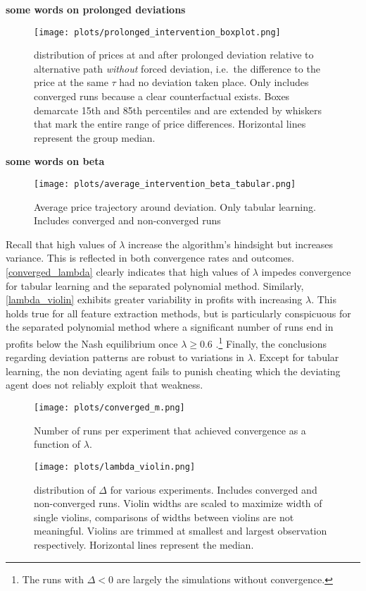 	\textbf{some words on prolonged deviations}
	
\begin{figure}
		\texttt{[image: plots/prolonged\_intervention\_boxplot.png]}
		\caption{distribution of prices at and after prolonged deviation relative to alternative path \emph{without} forced deviation, i.e.\ the difference to the price at the same $\tau$ had no deviation taken place. Only includes converged runs because a clear counterfactual exists. Boxes demarcate 15th and 85th percentiles and are extended by whiskers that mark the entire range of price differences. Horizontal lines represent the group median.}
		\label{prolonged_intervention_boxplot}
\end{figure}

\textbf{some words on beta}

\begin{figure}
	\texttt{[image: plots/average\_intervention\_beta\_tabular.png]}
	\caption{Average price trajectory around deviation. Only tabular learning. Includes converged and non-converged runs}
	\label{average_intervention_beta_tabular}
\end{figure}

Recall that high values of $\lambda$ increase the algorithm's hindsight but increases variance. This is reflected in both convergence rates and outcomes. \autoref{converged_lambda} clearly indicates that high values of $\lambda$ impedes convergence for tabular learning and the separated polynomial method. Similarly, \autoref{lambda_violin} exhibits greater variability in profits with increasing $\lambda$. This holds true for all feature extraction methods, but is particularly conspicuous for the separated polynomial method where a significant number of runs end in profits below the Nash equilibrium once $\lambda \ge 0.6$ .\footnote{The runs with $\Delta <0$ are largely the simulations without convergence.} Finally, the conclusions regarding deviation patterns are robust to variations in $\lambda$. Except for tabular learning, the non deviating agent fails to punish cheating which the deviating agent does not reliably exploit that weakness.

\begin{figure}
	\texttt{[image: plots/converged\_m.png]}
	\caption{Number of runs per experiment that achieved convergence as a function of $\lambda$.}
	\label{converged_lambda}
\end{figure}

\begin{figure}
	\texttt{[image: plots/lambda\_violin.png]}
	\caption{distribution of $\Delta$ for various experiments. Includes converged and non-converged runs. Violin widths are scaled to maximize width of single violins, comparisons of widths between violins are not meaningful. Violins are trimmed at smallest and largest observation respectively. Horizontal lines represent the median.}
	\label{lambda_violin}
\end{figure}


